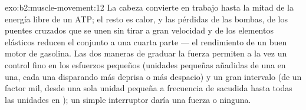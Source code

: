 \begin{solution}{exo:b2:muscle-movement:12}
La cabeza convierte en trabajo hasta la mitad de la energía libre de un
ATP; el resto es calor, y las pérdidas de las bombas, de los puentes
cruzados que se unen sin tirar a gran velocidad y de los elementos
elásticos reducen el conjunto a una cuarta parte --- el rendimiento de un
buen motor de gasolina. Las dos maneras de graduar la fuerza permiten a la
vez un control fino en los esfuerzos pequeños (unidades pequeñas añadidas
de una en una, cada una disparando más deprisa o más despacio) y un gran
intervalo (de un factor mil, desde una sola unidad pequeña a frecuencia de
sacudida hasta todas las unidades en ); un simple interruptor daría
una fuerza o ninguna.
\end{solution}

